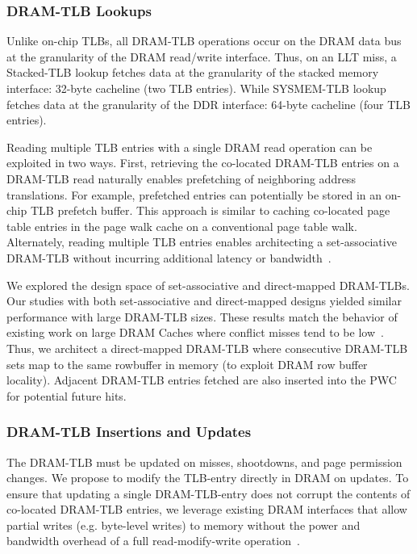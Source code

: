 \subsubsection{DRAM-TLB Lookups}

\noindent Unlike on-chip TLBs, all DRAM-TLB operations occur on the
DRAM data bus at the granularity of the DRAM read/write interface.
Thus, on an LLT miss, a Stacked-TLB lookup fetches data at the
granularity of the stacked memory interface: 32-byte cacheline (two
TLB entries). While SYSMEM-TLB lookup fetches data at the granularity
of the DDR interface: 64-byte cacheline (four TLB entries).

Reading multiple TLB entries with a single DRAM read operation can be
exploited in two ways. First, retrieving the co-located DRAM-TLB
entries on a DRAM-TLB read naturally enables prefetching of
neighboring address translations. For example, prefetched entries can
potentially be stored in an on-chip TLB prefetch buffer. This approach
is similar to caching co-located page table entries in the page walk
cache on a conventional page table walk. Alternately, reading multiple
TLB entries enables architecting a set-associative DRAM-TLB without
incurring additional latency or bandwidth~\cite{moin2012,loh2011}. 

We explored the design space of set-associative and direct-mapped
DRAM-TLBs. Our studies with both set-associative and direct-mapped
designs yielded similar performance with large DRAM-TLB sizes. These
results match the behavior of existing work on large DRAM Caches where
conflict misses tend to be low~\cite{moin2012}. Thus, we architect a
direct-mapped DRAM-TLB where consecutive DRAM-TLB sets map to the same
rowbuffer in memory (to exploit DRAM row buffer locality). Adjacent
DRAM-TLB entries fetched are also inserted into the PWC for potential
future hits.


\subsubsection{DRAM-TLB Insertions and Updates}

\noindent The DRAM-TLB must be updated on misses, shootdowns, and page
permission changes. We propose to modify the TLB-entry directly in
DRAM on updates. To ensure that updating a single DRAM-TLB-entry does
not corrupt the contents of co-located DRAM-TLB entries, we leverage
existing DRAM interfaces that allow partial writes (e.g. byte-level
writes) to memory without the power and bandwidth overhead of a full
read-modify-write operation~\cite{hbm-spec}.


